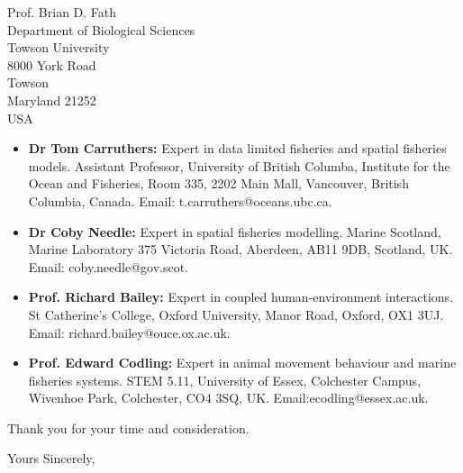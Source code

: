 \documentclass[12pt]{letter}
\begin{document}
\begin{letter}{Prof. Brian D. Fath \\ Department of Biological Sciences \\
		Towson University \\ 8000 York Road \\ Towson \\ Maryland 21252 \\ USA}
\begin{itemize} 
	\item \textbf{Dr Tom Carruthers:} Expert in data limited fisheries and
		spatial fisheries models. Assistant Professor, University of British
		Columba, Institute for the Ocean and Fisheries, Room 335, 2202
		Main Mall, Vancouver, British
		Columbia, Canada. Email: t.carruthers@oceans.ubc.ca.\\ 
	\item \textbf{Dr Coby Needle:} Expert in spatial fisheries modelling.
		Marine Scotland, Marine Laboratory 375 Victoria Road, Aberdeen,
		AB11 9DB, Scotland, UK. Email: coby.needle@gov.scot. \\   
	\item \textbf{Prof. Richard Bailey:} Expert in coupled
		human-environment interactions. St Catherine's College, Oxford
		University, Manor Road, Oxford, OX1 3UJ. Email:
		richard.bailey@ouce.ox.ac.uk. 
	\item \textbf{Prof. Edward Codling:} Expert in animal movement
		behaviour and marine fisheries systems. STEM 5.11, University
		of Essex, Colchester Campus, Wivenhoe Park, Colchester, CO4
		3SQ, UK. Email:ecodling@essex.ac.uk.  
\end{itemize}

Thank you for your time and consideration.

\closing{Yours Sincerely,} \end{letter} 
\end{document}
